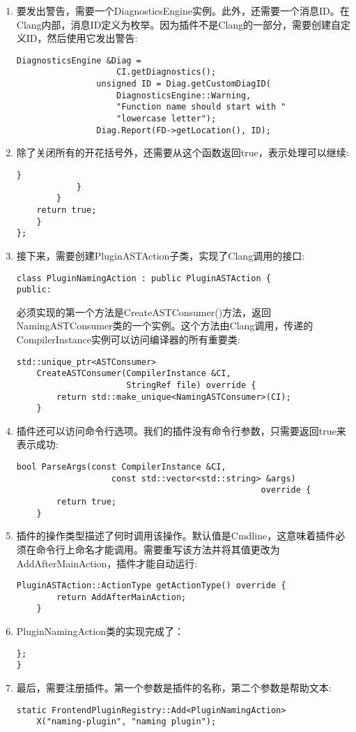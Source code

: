 \begin{enumerate}
\item 要发出警告，需要一个DiagnosticsEngine实例。此外，还需要一个消息ID。在Clang内部，消息ID定义为枚举。因为插件不是Clang的一部分，需要创建自定义ID，然后使用它发出警告:
\begin{lstlisting}[caption={}]
				DiagnosticsEngine &Diag =
					CI.getDiagnostics();
				unsigned ID = Diag.getCustomDiagID(
					DiagnosticsEngine::Warning,
					"Function name should start with "
					"lowercase letter");
				Diag.Report(FD->getLocation(), ID);
\end{lstlisting}

\item 除了关闭所有的开花括号外，还需要从这个函数返回true，表示处理可以继续:
\begin{lstlisting}[caption={}]
				}
			}
		}
	return true;
	}
};
\end{lstlisting}

\item 接下来，需要创建PluginASTAction子类，实现了Clang调用的接口:
\begin{lstlisting}[caption={}]
class PluginNamingAction : public PluginASTAction {
public:
\end{lstlisting}
必须实现的第一个方法是CreateASTConsumer()方法，返回NamingASTConsumer类的一个实例。这个方法由Clang调用，传递的CompilerInstance实例可以访问编译器的所有重要类:
\begin{lstlisting}[caption={}]
	std::unique_ptr<ASTConsumer>
	CreateASTConsumer(CompilerInstance &CI,
					  StringRef file) override {
		return std::make_unique<NamingASTConsumer>(CI);
	}
\end{lstlisting}

\item 插件还可以访问命令行选项。我们的插件没有命令行参数，只需要返回true来表示成功:
\begin{lstlisting}[caption={}]
	bool ParseArgs(const CompilerInstance &CI,
				   const std::vector<std::string> &args)
												 override {
		return true;
	}
\end{lstlisting}

\item 插件的操作类型描述了何时调用该操作。默认值是Cmdline，这意味着插件必须在命令行上命名才能调用。需要重写该方法并将其值更改为AddAfterMainAction，插件才能自动运行:
\begin{lstlisting}[caption={}]
	PluginASTAction::ActionType getActionType() override {
		return AddAfterMainAction;
	}
\end{lstlisting}

\item PluginNamingAction类的实现完成了：
\begin{lstlisting}[caption={}]
};
}
\end{lstlisting}

\item 最后，需要注册插件。第一个参数是插件的名称，第二个参数是帮助文本:
\begin{lstlisting}[caption={}]
static FrontendPluginRegistry::Add<PluginNamingAction>
	X("naming-plugin", "naming plugin");
\end{lstlisting}

\end{enumerate}

